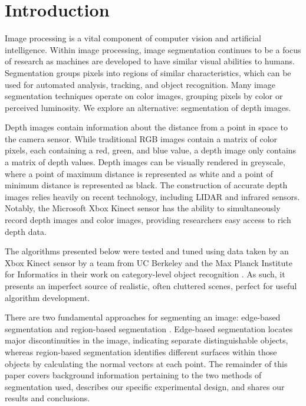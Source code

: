 
\section{Introduction}
\label{sec:intro}
Image processing is a vital component of computer vision and
artificial intelligence. Within image processing, image segmentation
continues to be a focus of research as machines are developed to have similar visual abilities to humans. Segmentation 
groups pixels into regions of similar characteristics, which can be used
for automated analysis, tracking, and object recognition.  Many image segmentation techniques operate on color images, grouping pixels by color or perceived luminosity.  We explore an alternative: segmentation of depth images.

Depth images contain information about the distance from a point in space to the camera sensor. While traditional RGB images contain a matrix
of color pixels, each containing a red, green, and blue value, a depth image
only contains a matrix of depth values. Depth images can be visually
rendered in greyscale, where a point of maximum distance
is represented as white and a point of minimum distance is represented
as black. The construction of accurate depth images relies heavily on recent technology, including LIDAR and infrared sensors.  Notably, the Microsoft Xbox Kinect
sensor has the ability to simultaneously record depth images and color
images, providing researchers easy access to rich depth data.

The algorithms presented below were tested and tuned using data taken by an Xbox Kinect sensor by a team from UC Berkeley and the Max Planck Institute for Informatics in their work on category-level object recognition \cite{kinect}.  As such, it presents an imperfect source of realistic, often cluttered scenes, perfect for useful algorithm development.

There are two fundamental approaches for segmenting an image: edge-based
segmentation and region-based segmentation \cite{aima}. Edge-based
segmentation locates major discontinuities in the image, indicating
separate distinguishable objects, whereas region-based segmentation
identifies different surfaces within those objects by calculating the
normal vectors at each point. The remainder of this paper covers
background information pertaining to the two methods of segmentation used,
describes our specific experimental design, and shares our results and conclusions. 

